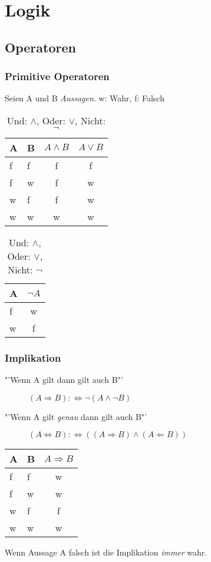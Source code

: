 \section{Logik}
\subsection{Operatoren}
\begin{frame}
  \frametitle{Primitive Operatoren}
  \begin{definition}
    Seien A und B \emph{Aussagen}. w: Wahr, f: Falsch
    
  	\begin{table}
    	\begin{tabular}{|l|l||c||c|}
    	\hline
    	A & B & $ A \wedge B$ & $A \vee B$\\
      \hline
	      f & f & f & f \\
	      f & w & f & w \\
	      w & f & f & w \\
	      w & w & w & w \\
      \hline
      \end{tabular}
    	\begin{tabular}{|l||c|}
    	\hline
    	A & $\neg A$\\
      \hline
	      f & w\\
	      w & f\\
      \hline

      \end{tabular}
       \caption{Und: $\wedge$, Oder: $\vee$, Nicht: $\neg$}
    \end{table}
  \end{definition}
\end{frame}
\begin{frame}
  \frametitle{Implikation}
  \begin{definition}
    \begin{description}
    \item["'Wenn A gilt dann gilt auch B"'] $(A \Rightarrow B) :\Leftrightarrow \neg (A \wedge \neg B)$
    \item["'Wenn A gilt \emph{genau} dann gilt auch B"']$(A \Leftrightarrow B) :\Leftrightarrow ((A \Rightarrow B) \wedge (A \Leftarrow B))$
    \end{description}
  	\begin{table}
    	\begin{tabular}{|l|l||c|}
    	\hline
    	A & B & $ A \Rightarrow B$\\
      \hline
	      f & f & w \\
	      f & w & w \\
	      w & f & f \\
	      w & w & w \\
      \hline
      \end{tabular}
    \end{table}
  \end{definition}
  \begin{alertblock}{}
    Wenn Aussage A falsch ist die Implikation \emph{immer} wahr.
  \end{alertblock}
\end{frame}

